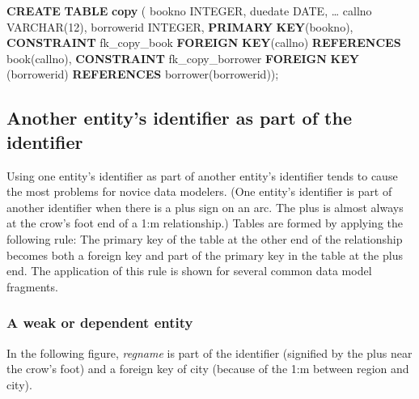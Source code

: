 \documentclass[
]{article}
\newenvironment{Shaded}{\begin{snugshade}}{\end{snugshade}}
\newcommand{\DataTypeTok}[1]{\textcolor[rgb]{0.13,0.29,0.53}{#1}}
\newcommand{\DecValTok}[1]{\textcolor[rgb]{0.00,0.00,0.81}{#1}}
\newcommand{\KeywordTok}[1]{\textcolor[rgb]{0.13,0.29,0.53}{\textbf{#1}}}
\newcommand{\NormalTok}[1]{#1}
\begin{document}
\begin{Shaded}
\begin{Highlighting}[]
\KeywordTok{CREATE} \KeywordTok{TABLE} \KeywordTok{copy}\NormalTok{ (}
\NormalTok{    bookno          }\DataTypeTok{INTEGER}\NormalTok{,}
\NormalTok{    duedate     }\DataTypeTok{DATE}\NormalTok{,}
\NormalTok{    … }
\NormalTok{    callno          }\DataTypeTok{VARCHAR}\NormalTok{(}\DecValTok{12}\NormalTok{),}
\NormalTok{    borrowerid      }\DataTypeTok{INTEGER}\NormalTok{,}
        \KeywordTok{PRIMARY} \KeywordTok{KEY}\NormalTok{(bookno),}
        \KeywordTok{CONSTRAINT}\NormalTok{ fk\_copy\_book}
            \KeywordTok{FOREIGN} \KeywordTok{KEY}\NormalTok{(callno) }\KeywordTok{REFERENCES}\NormalTok{ book(callno),}
        \KeywordTok{CONSTRAINT}\NormalTok{ fk\_copy\_borrower}
            \KeywordTok{FOREIGN} \KeywordTok{KEY}\NormalTok{ (borrowerid) }\KeywordTok{REFERENCES}\NormalTok{ borrower(borrowerid));}
\end{Highlighting}
\end{Shaded}

\hypertarget{another-entitys-identifier-as-part-of-the-identifier}{%
\subsection*{Another entity's identifier as part of the identifier}\label{another-entitys-identifier-as-part-of-the-identifier}}

Using one entity's identifier as part of another entity's identifier
tends to cause the most problems for novice data modelers. (One entity's
identifier is part of another identifier when there is a plus sign on an
arc. The plus is almost always at the crow's foot end of a 1:m
relationship.) Tables are formed by applying the following rule: The
primary key of the table at the other end of the relationship becomes
both a foreign key and part of the primary key in the table at the plus
end. The application of this rule is shown for several common data model
fragments.

\hypertarget{a-weak-or-dependent-entity}{%
\subsubsection*{A weak or dependent entity}\label{a-weak-or-dependent-entity}}

In the following figure, \emph{regname} is part of the identifier (signified
by the plus near the crow's foot) and a foreign key of city (because of
the 1:m between region and city).
\end{document}
